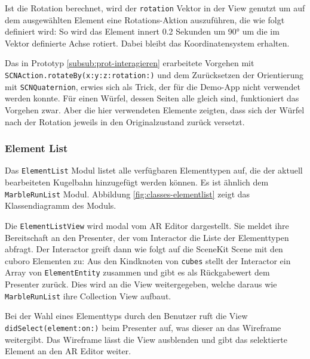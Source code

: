 Ist die Rotation berechnet, wird der \texttt{rotation} Vektor in der View genutzt um auf dem ausgewählten Element eine Rotations-Aktion auszuführen, die wie folgt definiert wird:
So wird das Element innert 0.2 Sekunden um 90° um die im Vektor definierte Achse rotiert.
Dabei bleibt das Koordinatensystem erhalten.

Das in Prototyp \ref{subsub:prot-interagieren} erarbeitete Vorgehen mit \texttt{SCNAction.rotateBy(x:y:z:rotation:)} und dem Zurücksetzen der Orientierung mit \texttt{SCNQuaternion}, erwies sich als Trick, der für die Demo-App nicht verwendet werden konnte.
Für einen Würfel, dessen Seiten alle gleich sind, funktioniert das Vorgehen zwar.
Aber die hier verwendeten Elemente zeigten, dass sich der Würfel nach der Rotation jeweils in den Originalzustand zurück versetzt. 

\subsubsection{Element List} \label{subsub:umsetzung-modul-elementlist}

Das \texttt{ElementList} Modul listet alle verfügbaren Elementtypen auf, die der aktuell bearbeiteten Kugelbahn hinzugefügt werden können.
Es ist ähnlich dem \texttt{MarbleRunList} Modul.
Abbildung \ref{fig:classes-elementlist} zeigt das Klassendiagramm des Moduls.


Die \texttt{ElementListView} wird modal vom AR Editor dargestellt.
Sie meldet ihre Bereitschaft an den Presenter, der vom Interactor die Liste der Elementtypen abfragt.
Der Interactor greift dann wie folgt auf die SceneKit Scene mit den cuboro Elementen zu:
Aus den Kindknoten von \texttt{cubes} stellt der Interactor ein Array von \texttt{ElementEntity} zusammen und gibt es als Rückgabewert dem Presenter zurück.
Dies wird an die View weitergegeben, welche daraus wie \texttt{MarbleRunList} ihre Collection View aufbaut.

Bei der Wahl eines Elementtyps durch den Benutzer ruft die View \texttt{didSelect(element:on:)} beim Presenter auf, was dieser an das Wireframe weitergibt.
Das Wireframe lässt die View ausblenden und gibt das selektierte Element an den AR Editor weiter.

